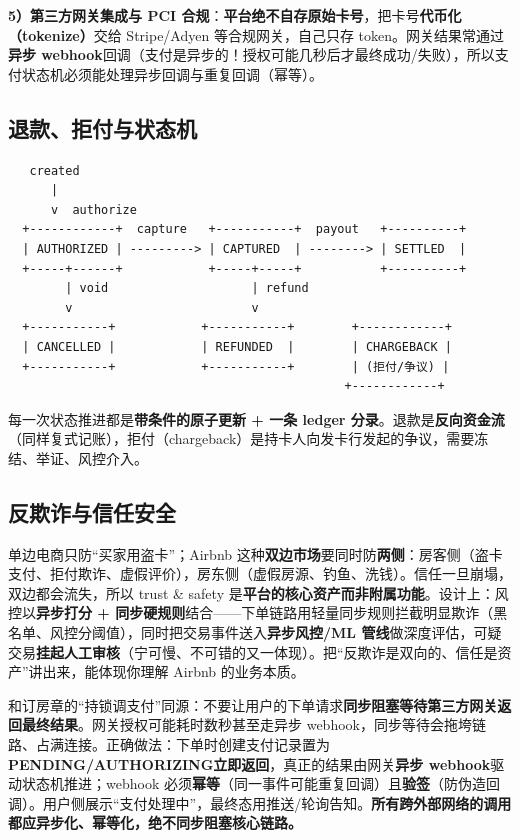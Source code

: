 \textbf{5）第三方网关集成与 PCI 合规}：\textbf{平台绝不自存原始卡号}，把卡号\textbf{代币化（tokenize）}交给 Stripe/Adyen 等合规网关，自己只存 token。网关结果常通过\textbf{异步 webhook}回调（支付是异步的！授权可能几秒后才最终成功/失败），所以支付状态机必须能处理异步回调与重复回调（幂等）。

\subsection{退款、拒付与状态机}

\begin{lstlisting}
   created
      |
      v  authorize
  +------------+  capture   +-----------+  payout   +----------+
  | AUTHORIZED | ---------> | CAPTURED  | --------> | SETTLED  |
  +-----+------+            +-----+-----+           +----------+
        | void                    | refund
        v                         v
  +-----------+            +-----------+        +------------+
  | CANCELLED |            | REFUNDED  |        | CHARGEBACK |
  +-----------+            +-----------+        | (拒付/争议) |
                                               +------------+
\end{lstlisting}

每一次状态推进都是\textbf{带条件的原子更新 + 一条 ledger 分录}。退款是\textbf{反向资金流}（同样复式记账），拒付（chargeback）是持卡人向发卡行发起的争议，需要冻结、举证、风控介入。

\subsection{反欺诈与信任安全}

\begin{idea}
单边电商只防“买家用盗卡”；Airbnb 这种\textbf{双边市场}要同时防\textbf{两侧}：房客侧（盗卡支付、拒付欺诈、虚假评价），房东侧（虚假房源、钓鱼、洗钱）。信任一旦崩塌，双边都会流失，所以 trust \& safety 是\textbf{平台的核心资产而非附属功能}。设计上：风控以\textbf{异步打分 + 同步硬规则}结合——下单链路用轻量同步规则拦截明显欺诈（黑名单、风控分阈值），同时把交易事件送入\textbf{异步风控/ML 管线}做深度评估，可疑交易\textbf{挂起人工审核}（宁可慢、不可错的又一体现）。把“反欺诈是双向的、信任是资产”讲出来，能体现你理解 Airbnb 的业务本质。
\end{idea}

\begin{pitfall}[把支付确认同步卡在第三方网关回调上]
和订房章的“持锁调支付”同源：不要让用户的下单请求\textbf{同步阻塞等待第三方网关返回最终结果}。网关授权可能耗时数秒甚至走异步 webhook，同步等待会拖垮链路、占满连接。正确做法：下单时创建支付记录置为\textbf{PENDING/AUTHORIZING}\textbf{立即返回}，真正的结果由网关\textbf{异步 webhook}驱动状态机推进；webhook 必须\textbf{幂等}（同一事件可能重复回调）且\textbf{验签}（防伪造回调）。用户侧展示“支付处理中”，最终态用推送/轮询告知。\textbf{所有跨外部网络的调用都应异步化、幂等化，绝不同步阻塞核心链路。}
\end{pitfall}


